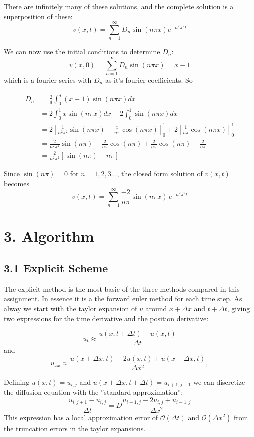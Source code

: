 \documentclass[a4paper,11pt]{report}
\begin{document}
There are infinitely many of these solutions, and the complete solution is a superposition of these: 
\[
 v(x, t) = \displaystyle \sum_{n=1}^{\infty} D_n \sin(n\pi x) e^{-n^2 \pi^2 t}
\]

We can now use the initial conditions to determine $D_n$: 
\[
 v(x, 0) = \displaystyle \sum_{n=1}^{\infty} D_n \sin(n\pi x) = x - 1
\]
which is a fourier series  with $D_n$ as it's fourier coefficients. So

\begin{align*}
D_n &= \frac{2}{d} \displaystyle \int_0^d (x - 1)\sin(n\pi x) dx \\
&= 2 \displaystyle \int_0^1 x\sin(n\pi x) dx - 2\displaystyle \int_0^1 \sin(n\pi x) dx \\
&= 2\left[ \frac{1}{n^2 \pi^2} \sin(n \pi x) - \frac{x}{n \pi} \cos(n \pi x)\right]_0^1 + 2\left[\frac{1}{n \pi} \cos(n \pi x) \right]_0^1 \\
&= \frac{2}{n^2 \pi^2} \sin(n \pi) - \frac{2}{n\pi} \cos(n\pi) + \frac{2}{n\pi}\cos(n\pi) - \frac{2}{n\pi} \\
&= \frac{2}{n^2 \pi^2}\left[ \sin(n\pi) - n \pi \right]
\end{align*}

Since $\sin(n\pi) = 0$ for $n = 1, 2, 3 \ldots$, the closed form solution of $v(x, t)$ becomes
\begin{equation}
v(x, t) = \displaystyle \sum_{n=1}^\infty \frac{-2}{n\pi} \sin(n\pi x)\,e^{-n^2\pi^2 t}
\end{equation}


\section*{3. Algorithm}


\subsection*{3.1 Explicit Scheme}

The explicit method is the most basic of the three methods compared in this assignment. In essence it is a the forward euler method for each time step. As alway we start with the taylor expansion of $u$ around $ x + \Delta x$ and $t + \Delta t$, giving two expressions for the time derivative and the position derivative: 

 \[
u_t\approx \frac{u(x,t+\Delta t)-u(x,t)}{\Delta t}
\]
and
\[
u_{xx}\approx \frac{u(x+\Delta x,t)-2u(x,t)+u(x-\Delta x,t)}{\Delta x^2},
\]

Defining $u(x, t) = u_{i,j}$ and $u(x + \Delta x, t + \Delta t) = u_{i+1, j+1}$ we can discretize the diffusion equation with the ''standard approximation'':
\begin{equation}\label{eq:explicit}
\frac{u_{i, j+1} - u_{i, j}}{\Delta t} = D\frac{u_{i+1,j} - 2u_{i,j} + u_{i-1, j}}{\Delta x^2} 
\end{equation}
This expression has a local approximation error of $\mathcal{O}(\Delta t)$ and $\mathcal{O}(\Delta x^2)$ from the truncation errors in the taylor expansions. 
\end{document}
